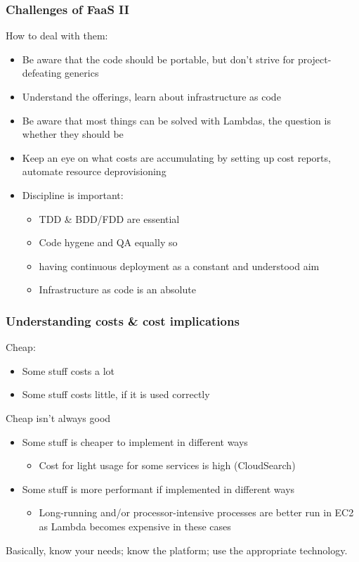\documentclass{beamer}
\begin{document}
\begin{frame}
\frametitle{Challenges of FaaS II}
How to deal with them:
\begin{itemize}
  \item Be aware that the code should be portable, but don't strive for project-defeating generics
  \item Understand the offerings, learn about infrastructure as code
  \item Be aware that most things can be solved with Lambdas, the question is whether they should be
  \item Keep an eye on what costs are accumulating by setting up cost reports, automate resource deprovisioning
  \item Discipline is important: 
  \begin{itemize}
    \item TDD \& BDD/FDD are essential
    \item Code hygene and QA equally so
    \item having continuous deployment as a constant and understood aim
    \item Infrastructure as code is an absolute
  \end{itemize}
\end{itemize}
\end{frame}

\begin{frame}
\frametitle{Understanding costs \& cost implications}
Cheap:
\begin{itemize}
  \item Some stuff costs a lot
  \item Some stuff costs little, if it is used correctly
\end{itemize}
Cheap isn't always good
\begin{itemize}
  \item Some stuff is cheaper to implement in different ways
  \begin{itemize}
    \item Cost for light usage for some services is high (CloudSearch)
  \end{itemize}
  \item Some stuff is more performant if implemented in different ways
  \begin{itemize}
    \item Long-running and/or processor-intensive processes are better run in EC2 as Lambda becomes expensive in these cases
  \end{itemize}
\end{itemize}
Basically, know your needs; know the platform; use the appropriate technology.

\end{frame}
\end{document}
